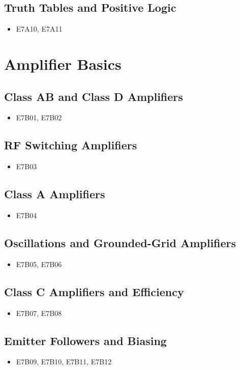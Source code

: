 \documentclass{book}
\begin{document}
\subsection{Truth Tables and Positive Logic}
\begin{itemize}
    \item E7A10, E7A11
\end{itemize}

\section{Amplifier Basics}
\subsection{Class AB and Class D Amplifiers}
\begin{itemize}
    \item E7B01, E7B02
\end{itemize}
\subsection{RF Switching Amplifiers}
\begin{itemize}
    \item E7B03
\end{itemize}
\subsection{Class A Amplifiers}
\begin{itemize}
    \item E7B04
\end{itemize}
\subsection{Oscillations and Grounded-Grid Amplifiers}
\begin{itemize}
    \item E7B05, E7B06
\end{itemize}
\subsection{Class C Amplifiers and Efficiency}
\begin{itemize}
    \item E7B07, E7B08
\end{itemize}
\subsection{Emitter Followers and Biasing}
\begin{itemize}
    \item E7B09, E7B10, E7B11, E7B12
\end{itemize}
\end{document}
